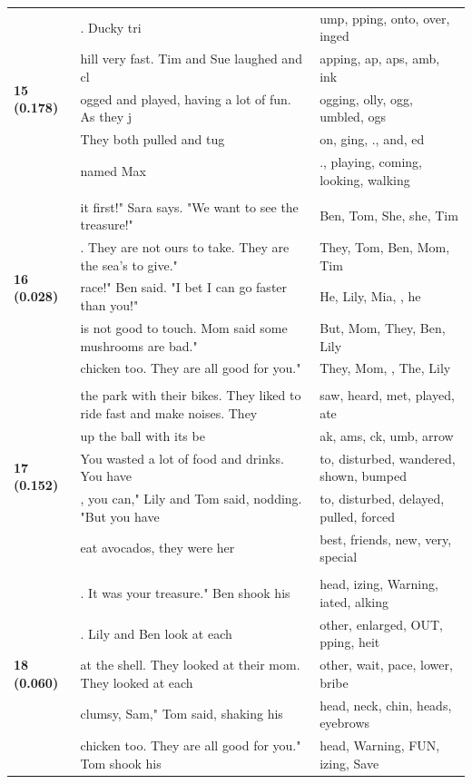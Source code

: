 \documentclass{article}
\theoremstyle{plain}
\theoremstyle{definition}
\theoremstyle{remark}
\begin{document}
\begin{longtable}{|p{}|p{}|p{}|}
\multirow{5}{*}{\textbf{15 (0.178)}} & . Ducky tri & ump, pping,  onto,  over, inged \\
& hill very fast. Tim and Sue laughed and cl & apping, ap, aps, amb, ink \\
& ogged and played, having a lot of fun. As they j & ogging, olly, ogg, umbled, ogs \\
& They both pulled and tug & on, ging, .,  and, ed \\
& named Max & .,  playing,  coming,  looking,  walking \\
& & \\
\multirow{5}{*}{\textbf{16 (0.028)}} & it first!" Sara says. "We want to see the treasure!" & Ben,  Tom,  She,  she,  Tim \\
& . They are not ours to take. They are the sea's to give." & They,  Tom,  Ben,  Mom,  Tim \\
& race!" Ben said. "I bet I can go faster than you!" & He,  Lily,  Mia,  ,  he \\
& is not good to touch. Mom said some mushrooms are bad." & But,  Mom,  They,  Ben,  Lily \\
& chicken too. They are all good for you." & They,  Mom,  ,  The,  Lily \\
& & \\
\multirow{5}{*}{\textbf{17 (0.152)}} & the park with their bikes. They liked to ride fast and make noises. They & saw,  heard,  met,  played,  ate \\
& up the ball with its be & ak, ams, ck, umb,  arrow \\
& You wasted a lot of food and drinks. You have & to,  disturbed,  wandered,  shown,  bumped \\
& , you can," Lily and Tom said, nodding. "But you have & to,  disturbed,  delayed,  pulled,  forced \\
& eat avocados, they were her & best,  friends,  new,  very,  special \\
& & \\
\multirow{5}{*}{\textbf{18 (0.060)}} & . It was your treasure."  Ben shook his & head, izing,  Warning, iated, alking \\
& .  Lily and Ben look at each & other,  enlarged,  OUT, pping, heit \\
& at the shell. They looked at their mom. They looked at each & other,  wait,  pace,  lower,  bribe \\
& clumsy, Sam," Tom said, shaking his & head,  neck,  chin,  heads,  eyebrows \\
& chicken too. They are all good for you."  Tom shook his & head,  Warning,  FUN, izing, Save \\

\end{longtable}
\end{document}
